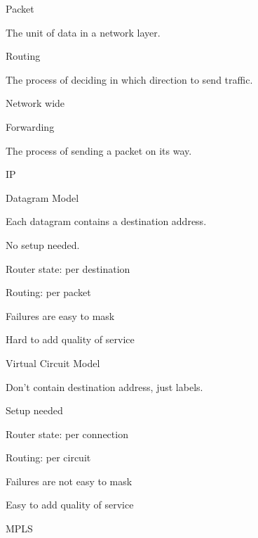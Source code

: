 \documentclass[main.tex]{subfiles}
\begin{document}
\small


\full{}
\begin{card}{Packet}
\item The unit of data in a network layer.
\end{card}

\full{}
\begin{card}{Routing}
\item The process of deciding in which direction to send traffic.
\item Network wide
\end{card}

\full{}
\begin{card}{Forwarding}
\item The process of sending a packet on its way.
\end{card}

\begin{card}{IP}
\item 
\end{card}

\full{}
\begin{card}{Datagram Model}
\item Each datagram contains a destination address.
\item No setup needed.
\item Router state: per destination
\item Routing: per packet
\item Failures are easy to mask
\item Hard to add quality of service
\end{card}

\full{}
\begin{card}{Virtual Circuit Model}
\item Don't contain destination address, just labels.
\item Setup needed
\item Router state: per connection
\item Routing: per circuit
\item Failures are not easy to mask
\item Easy to add quality of service
\end{card}

\begin{card}{MPLS}
\item
\end{card}
\end{document}

